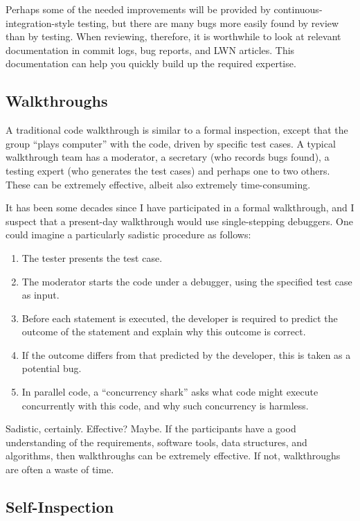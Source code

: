Perhaps some of the needed improvements will be provided by
continuous-integration-style testing, but there are many bugs more
easily found by review than by testing.
When reviewing, therefore, it is worthwhile to look at relevant documentation
in commit logs, bug reports, and LWN articles.
This documentation can help you quickly build up the required expertise.

\subsection{Walkthroughs}
\label{sec:debugging:Walkthroughs}

A traditional code walkthrough is similar to a formal inspection,
except that the group
``plays computer'' with the code, driven by specific test cases.
A typical walkthrough team has a moderator, a secretary (who records
bugs found), a testing expert (who generates the test cases) and
perhaps one to two others.
These can be extremely effective, albeit also extremely time-consuming.

It has been some decades since I have participated in a formal
walkthrough, and I suspect that a present-day walkthrough would
use single-stepping debuggers.
One could imagine a particularly sadistic procedure as follows:

\begin{enumerate}
\item	The tester presents the test case.
\item	The moderator starts the code under a debugger, using the
	specified test case as input.
\item	Before each statement is executed, the developer is required
	to predict the outcome of the statement and explain why
	this outcome is correct.
\item	If the outcome differs from that predicted by the developer,
	this is taken as a potential bug.
\item	In parallel code, a ``concurrency shark'' asks what code
	might execute concurrently with this code, and why such
	concurrency is harmless.
\end{enumerate}

Sadistic, certainly.
Effective?
Maybe.
If the participants have a good understanding of the requirements,
software tools, data structures, and algorithms, then walkthroughs
can be extremely effective.
If not, walkthroughs are often a waste of time.

\subsection{Self-Inspection}
\label{sec:debugging:Self-Inspection}

